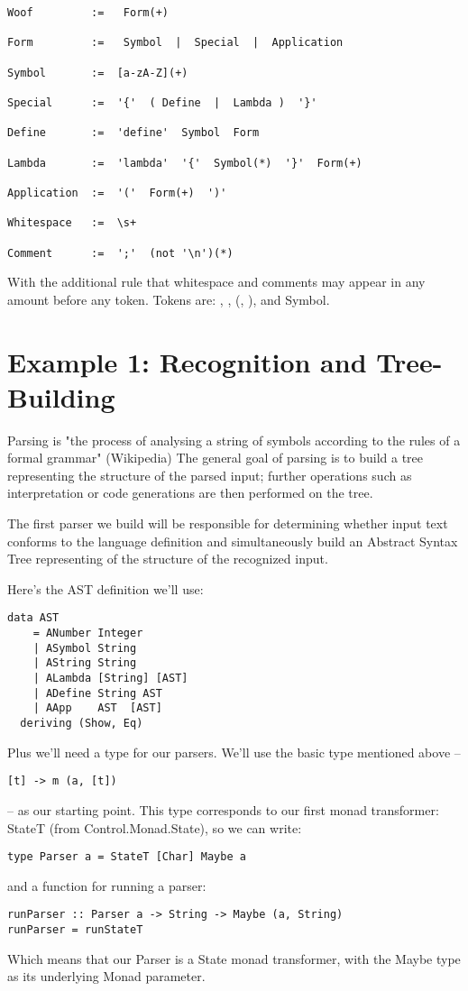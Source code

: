 \documentclass{tmr}
\begin{document}
\begin{verbatim}
Woof         :=   Form(+)

Form         :=   Symbol  |  Special  |  Application

Symbol       :=  [a-zA-Z](+)

Special      :=  '{'  ( Define  |  Lambda )  '}'

Define       :=  'define'  Symbol  Form

Lambda       :=  'lambda'  '{'  Symbol(*)  '}'  Form(+)

Application  :=  '('  Form(+)  ')'

Whitespace   :=  \s+

Comment      :=  ';'  (not '\n')(*)
\end{verbatim}
With the additional rule that whitespace and comments may appear in any 
amount before any token.  Tokens are:  {, }, (, ), and Symbol.



\section{Example 1: Recognition and Tree-Building}

Parsing is "the process of analysing a 
string of symbols according to the rules of a formal grammar" (Wikipedia)
The general goal of parsing is to build a tree representing the structure
of the parsed input; further operations such as interpretation or
code generations are then performed on the tree.

The first parser we build will be responsible for determining whether input
text conforms to the language definition and simultaneously build an 
Abstract Syntax Tree representing of the structure of the recognized input.

Here's the AST definition we'll use:
\begin{verbatim}
data AST
    = ANumber Integer
    | ASymbol String
    | AString String
    | ALambda [String] [AST]
    | ADefine String AST
    | AApp    AST  [AST]
  deriving (Show, Eq)
\end{verbatim}
Plus we'll need a type for our parsers.  We'll use the basic type mentioned 
above -- \begin{verbatim}[t] -> m (a, [t]) \end{verbatim}
 -- as our starting point.  This type corresponds to our first monad transformer:  
 StateT (from Control.Monad.State), so we can write:
\begin{verbatim}
type Parser a = StateT [Char] Maybe a
\end{verbatim}
and a function for running a parser:
\begin{verbatim}
runParser :: Parser a -> String -> Maybe (a, String)
runParser = runStateT
\end{verbatim}
Which means that our Parser is a State monad transformer, with the Maybe type
as its underlying Monad parameter.
\end{document}
